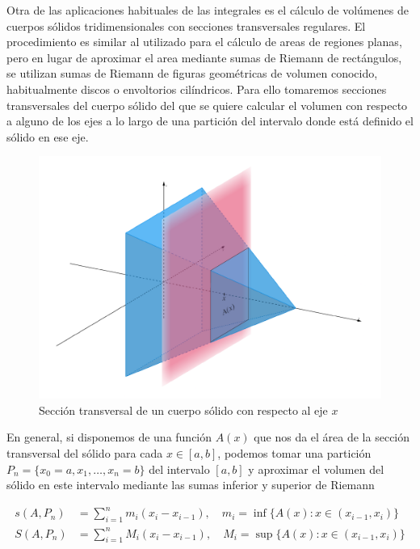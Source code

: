 \documentclass[
  a4paper,
]{scrreport}
\theoremstyle{definition}
\theoremstyle{plain}
\theoremstyle{definition}
\theoremstyle{definition}
\theoremstyle{plain}
\theoremstyle{plain}
\theoremstyle{remark}
\begin{document}
Otra de las aplicaciones habituales de las integrales es el cálculo de
volúmenes de cuerpos sólidos tridimensionales con secciones
transversales regulares. El procedimiento es similar al utilizado para
el cálculo de areas de regiones planas, pero en lugar de aproximar el
area mediante sumas de Riemann de rectángulos, se utilizan sumas de
Riemann de figuras geométricas de volumen conocido, habitualmente discos
o envoltorios cilíndricos. Para ello tomaremos secciones transversales
del cuerpo sólido del que se quiere calcular el volumen con respecto a
alguno de los ejes a lo largo de una partición del intervalo donde está
definido el sólido en ese eje.

\begin{figure}[H]

{\centering \includegraphics{img/integrales/seccion-transversal-piramide.pdf}

}

\caption{Sección transversal de un cuerpo sólido con respecto al eje
\(x\)}

\end{figure}%

En general, si disponemos de una función \(A(x)\) que nos da el área de
la sección transversal del sólido para cada \(x\in[a,b]\), podemos tomar
una partición \(P_n=\{x_0=a,x_1,\ldots, x_n=b\}\) del intervalo
\([a,b]\) y aproximar el volumen del sólido en este intervalo mediante
las sumas inferior y superior de Riemann

\begin{align*}
s(A,P_n) &= \sum_{i=1}^n m_i(x_i-x_{i-1}),\quad m_i=\inf\{A(x): x\in(x_{i-1},x_i)\}\\
S(A,P_n) &= \sum_{i=1}^n M_i(x_i-x_{i-1}),\quad M_i=\sup\{A(x): x\in(x_{i-1},x_i)\}
\end{align*}
\end{document}
